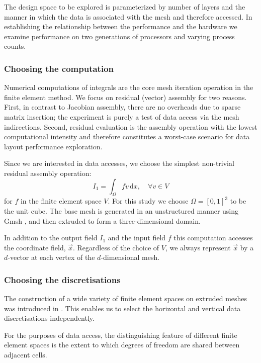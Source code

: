 \documentclass[11pt, a4paper]{scrartcl}
\begin{document}
The design space to be explored is parameterized by number of layers
and the manner in which the data is associated with the mesh and
therefore accessed. In establishing the relationship between the
performance and the hardware we examine performance on two generations
of processors and varying process counts.

\subsubsection{Choosing the computation}
\label{sssec:choosing-computation}
Numerical computations of integrals are the core mesh iteration
operation in the finite element method. We focus on residual (vector)
assembly for two reasons. First, in contrast to Jacobian assembly,
there are no overheads due to sparse matrix insertion; the experiment
is purely a test of data access via the mesh indirections. Second,
residual evaluation is the assembly operation with the lowest
computational intensity and therefore constitutes a worst-case
scenario for data layout performance exploration.

Since we are interested in data accesses, we choose the simplest
non-trivial residual assembly operation:
\begin{equation}
I_{1} = \int_{\Omega}\! f v \,\mathrm{d}x, \quad \forall v \in V
\end{equation}
for $f$ in the finite element space $V$.  For this study we choose
$\Omega = [0, 1]^3$ to be the unit cube.  The base mesh is generated
in an unstructured manner using Gmsh \citep{Geuzaine:2009}, and then
extruded to form a three-dimensional domain.

In addition to the output field $I_{1}$ and the input field $f$ this
computation accesses the coordinate field, $\vec{x}$. Regardless of
the choice of $V$, we always represent $\vec{x}$ by a $d$-vector at
each vertex of the $d$-dimensional mesh.

\subsubsection{Choosing the discretisations}
\label{sssec:choosing-discretisation}

The construction of a wide variety of finite element spaces on
extruded meshes was introduced in \citet{McRae:2016}. This enables us
to select the horizontal and vertical data discretisations
independently.

For the purposes of data access, the distinguishing feature of
different finite element spaces is the extent to which degrees of
freedom are shared between adjacent cells.
\end{document}
